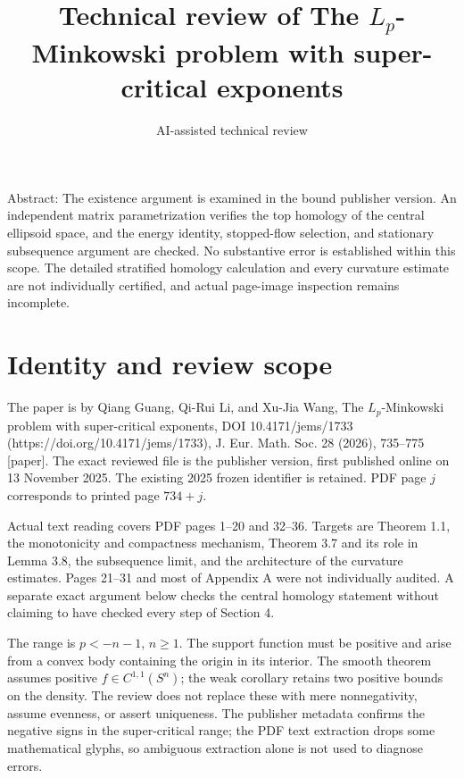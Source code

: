 \documentclass[10pt]{article}
\title{Technical review of The \(L_p\)-Minkowski problem with super-critical exponents}
\author{AI-assisted technical review}
\date{}
\begin{document}
\maketitle
Abstract: The existence argument is examined in the bound publisher version. An independent matrix parametrization verifies the top homology of the central ellipsoid space, and the energy identity, stopped-flow selection, and stationary subsequence argument are checked. No substantive error is established within this scope. The detailed stratified homology calculation and every curvature estimate are not individually certified, and actual page-image inspection remains incomplete.\par
\section*{Identity and review scope}
The paper is by Qiang Guang, Qi-Rui Li, and Xu-Jia Wang, The \(L_p\)-Minkowski problem with super-critical exponents, DOI 10.4171/jems/1733 (https://doi.org/10.4171/jems/1733), J. Eur. Math. Soc. 28 (2026), 735–775 [paper]. The exact reviewed file is the publisher version, first published online on 13 November 2025. The existing 2025 frozen identifier is retained. PDF page \(j\) corresponds to printed page \(734+j\).\par
Actual text reading covers PDF pages 1–20 and 32–36. Targets are Theorem 1.1, the monotonicity and compactness mechanism, Theorem 3.7 and its role in Lemma 3.8, the subsequence limit, and the architecture of the curvature estimates. Pages 21–31 and most of Appendix A were not individually audited. A separate exact argument below checks the central homology statement without claiming to have checked every step of Section 4.\par
The range is \(p<-n-1\), \(n\geq1\). The support function must be positive and arise from a convex body containing the origin in its interior. The smooth theorem assumes positive \(f\in C^{1,1}(S^n)\); the weak corollary retains two positive bounds on the density. The review does not replace these with mere nonnegativity, assume evenness, or assert uniqueness. The publisher metadata confirms the negative signs in the super-critical range; the PDF text extraction drops some mathematical glyphs, so ambiguous extraction alone is not used to diagnose errors.\par
\end{document}
